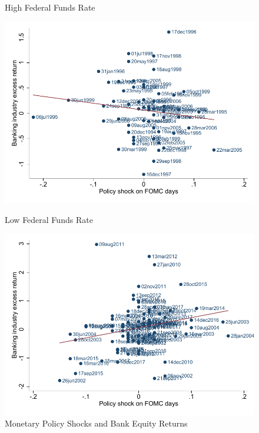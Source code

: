 \documentclass[12pt]{article}
\begin{document}
\newpage
\begin{figure}[h]
	\begin{centering}
		High Federal Funds Rate
		\par\end{centering}
	\begin{centering}
		\includegraphics[scale=0.8]{../output/Figures/bank_treasury2y_above}
		\par\end{centering}
	\vspace{5mm}
	\begin{centering}
		Low Federal Funds Rate
		\par
		\includegraphics[scale=0.8]{../output/Figures/bank_treasury2y_below}
		\caption{Monetary Policy Shocks and Bank Equity Returns\label{fig:stock_return}}

\end{centering}
\end{figure}
\end{document}
